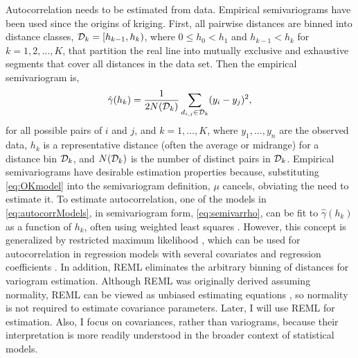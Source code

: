 \documentclass[11pt, titlepage]{article}\usepackage[]{graphicx}\usepackage[]{color}
\begin{document}
\begin{spacing}{1.9}
\begin{flushleft}
Autocorrelation needs to be estimated from data. Empirical semivariograms have been used since the origins of kriging. First, all pairwise distances are binned into distance classes, $\mathcal{D}_k = [h_{k-1},h_k)$, where $0 \le h_0 < h_1$ and $h_{k-1} < h_k$ for $k = 1, 2, \ldots, K$, that partition the real line into mutually exclusive and exhaustive segments that cover all distances in the data set.  Then the empirical semivariogram is,
\[
				\hat{\gamma}(h_k) = \frac{1}{2N(\mathcal{D}_k)}\sum_{d_{i,j} \in \mathcal{D}_k} (y_i - y_j)^2,
\]
for all possible pairs of $i$ and $j$, and $k = 1, \ldots, K$, where $y_1, . . . ,y_n$ are the observed data, $h_k$ is a representative distance (often the average or midrange) for a distance bin $\mathcal{D}_k$, and $N(\mathcal{D}_k)$ is the number of distinct pairs in $\mathcal{D}_k$. Empirical semivariograms have desirable estimation properties \citep[it is an unbiased estimator,][p. 71]{Cres:stat:1993} because, substituting \ref{eq:OKmodel} into the semivariogram definition, $\mu$ cancels, obviating the need to estimate it.  To estimate autocorrelation, one of the models in \ref{eq:autocorrModels}, in semivariogram form, \ref{eq:semivarrho}, can be fit to $\hat{\gamma}(h_k)$ as a function of $h_k$, often using weighted least squares \citep{Cres:fitt:1985}.  However, this concept is generalized by restricted maximum likelihood \citep[REML, ][]{Patt:Thom:reco:1971, Patt:Thom:maxi:1974}, which can be used for autocorrelation in regression models with several covariates and regression coefficients \citep[for REML applied to spatial models, see, e.g.,][p. 93]{Cres:stat:1993}. In addition, REML eliminates the arbitrary binning of distances for variogram estimation.  Although REML was originally derived assuming normality, REML can be viewed as unbiased estimating equations \citep{Heyd:quas:1994, Cres:Lahi:asym:1996}, so normality is not required to estimate covariance parameters.  Later, I will use REML for estimation. Also, I focus on covariances, rather than variograms, because their interpretation is more readily understood in the broader context of statistical models.


\end{flushleft}
\end{spacing}
\end{document}
